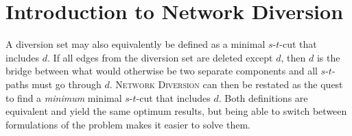 \section{Introduction to Network Diversion}



A diversion set may also equivalently be defined as a minimal $s$-$t$-cut that includes $d$. If all edges from the diversion set are deleted except $d$, then $d$ is the bridge between what would otherwise be two separate components and all $s$-$t$-paths must go through $d$. \textsc{Network Diversion} can then be restated as the quest to find a \emph{minimum} minimal $s$-$t$-cut that includes $d$. Both definitions are equivalent and yield the same optimum results, but being able to switch between formulations of the problem makes it easier to solve them.